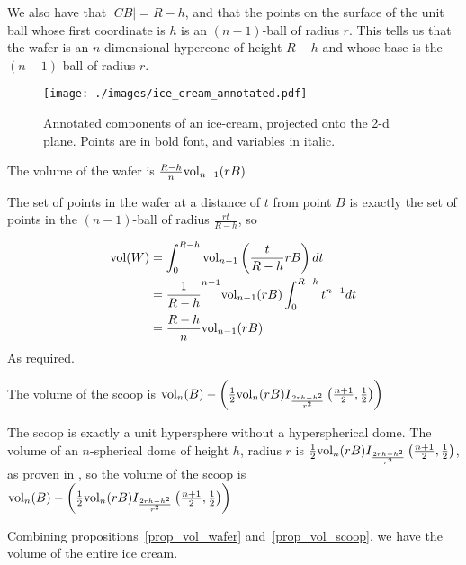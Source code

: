 We also have that $|CB| = R-h$, and that the points on the surface of the unit ball whose first coordinate is $h$ is an $(n-1)$-ball of radius $r$. This tells us that the wafer is an $n$-dimensional hypercone of height $R-h$ and whose base is the $(n-1)$-ball of radius $r$.

\begin{figure}
\centering
\texttt{[image: ./images/ice\_cream\_annotated.pdf]}
\caption{Annotated components of an ice-cream, projected onto the 2-d plane. Points are in bold font, and variables in italic.}
\label{fig_ice_cream_annotated}
\end{figure}

\begin{proposition} \label{prop_vol_wafer}
The volume of the wafer is $\frac{R-h}{n} \mbox{vol}_{n-1}(rB)$
\end{proposition}

The set of points in the wafer at a distance of $t$ from point $B$ is exactly the set of points in the $(n-1)$-ball of radius $\frac{rt}{R-h}$, so

\begin{align*}
\mbox{vol}(W)
&= \int^{R-h}_{0} \mbox{vol}_{n-1}\left(\frac{t}{R-h}rB\right) dt \\
&= \frac{1}{R-h}^{n-1} \mbox{vol}_{n-1}(rB) \int^{R-h}_0 t^{n-1}dt \\
&= \frac{R-h}{n} \mbox{vol}_{n-1}(rB)
\end{align*}
As required.

\begin{proposition} \label{prop_vol_scoop}
The volume of the scoop is $\mbox{vol}_n(B) - \left(\frac{1}{2}\mbox{vol}_n(rB) I_{\frac{2rh-h^2}{r^2}}\left(\frac{n+1}{2}, \frac{1}{2}\right)\right)$
\end{proposition}

The scoop is exactly a unit hypersphere without a hyperspherical dome. The volume of an $n$-spherical dome of height $h$, radius $r$ is $\frac{1}{2}\mbox{vol}_n(rB) I_{\frac{2rh-h^2}{r^2}}\left(\frac{n+1}{2}, \frac{1}{2}\right)$, as proven in \cite{Li11}, so the volume of the scoop is $\mbox{vol}_n(B) - \left(\frac{1}{2}\mbox{vol}_n(rB) I_{\frac{2rh-h^2}{r^2}}\left(\frac{n+1}{2}, \frac{1}{2}\right)\right)$

Combining propositions~\ref{prop_vol_wafer} and~\ref{prop_vol_scoop}, we have the volume of the entire ice cream.